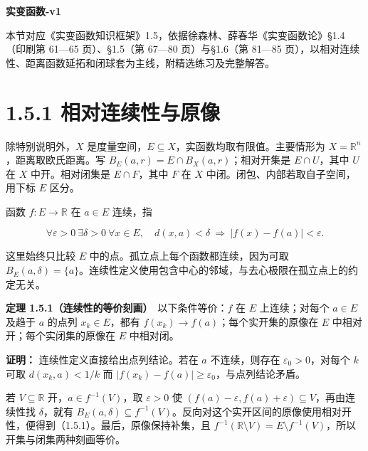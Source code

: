 \documentclass[11pt,a4paper]{article}
\begin{document}
\begin{center}
{\Large\bfseries 实变函数-v1\par}
\vspace{7pt}{\large 1.5 点集上的连续函数与纲\par}
\vspace{5pt}{第一章 集合与点集\par}
\end{center}
本节对应《实变函数知识框架》1.5，依据徐森林、薛春华《实变函数论》\S1.4（印刷第 61—65 页）、\S1.5（第 67—80 页）与\S1.6（第 81—85 页），以相对连续性、距离函数延拓和闭球套为主线，附精选练习及完整解答。
\begingroup\setlength{\parskip}{0pt}\tableofcontents\endgroup

\section[\S{}1.5.1
相对连续性与原像]{1.5.1
相对连续性与原像}\label{ux76f8ux5bf9ux8fdeux7eedux6027ux4e0eux539fux50cf}

除特别说明外，\(X\)
是度量空间，\(E\subseteq X\)，实函数均取有限值。主要情形为
\(X=\mathbb R^n\)，距离取欧氏距离。写
\(B_E(a,r)=E\cap B_X(a,r)\)；相对开集是 \(E\cap U\)，其中 \(U\) 在 \(X\)
中开。相对闭集是 \(E\cap F\)，其中 \(F\) 在 \(X\)
中闭。闭包、内部若取自子空间，用下标 \(E\) 区分。

函数 \(f:E\to\mathbb R\) 在 \(a\in E\) 连续，指

\begin{equation*}
\forall\varepsilon>0\ \exists\delta>0\ \forall x\in E,\quad
d(x,a)<\delta\ \Longrightarrow\ |f(x)-f(a)|<\varepsilon.
\tag{1.5.1}
\end{equation*}

这里始终只比较 \(E\) 中的点。孤立点上每个函数都连续，因为可取
\(B_E(a,\delta)=\{a\}\)。连续性定义使用包含中心的邻域，与去心极限在孤立点上的约定无关。

\textbf{定理 1.5.1（连续性的等价刻画）}　以下条件等价：\(f\) 在 \(E\)
上连续；对每个 \(a\in E\) 及趋于 \(a\) 的点列 \(x_k\in E\)，都有
\(f(x_k)\to f(a)\)；每个实开集的原像在 \(E\)
中相对开；每个实闭集的原像在 \(E\) 中相对闭。

\textbf{证明：} 连续性定义直接给出点列结论。若在 \(a\) 不连续，则存在
\(\varepsilon_0>0\)，对每个 \(k\) 可取 \(d(x_k,a)<1/k\) 而
\(|f(x_k)-f(a)|\ge\varepsilon_0\)，与点列结论矛盾。

若 \(V\subseteq\mathbb R\) 开，\(a\in f^{-1}(V)\)，取 \(\varepsilon>0\)
使 \((f(a)-\varepsilon,f(a)+\varepsilon)\subseteq V\)，再由连续性找
\(\delta\)，就有
\(B_E(a,\delta)\subseteq f^{-1}(V)\)。反向对这个实开区间的原像使用相对开性，便得到（1.5.1）。最后，原像保持补集，且
\(f^{-1}(\mathbb R\setminus V)=E\setminus f^{-1}(V)\)，所以开集与闭集两种刻画等价。
\end{document}
